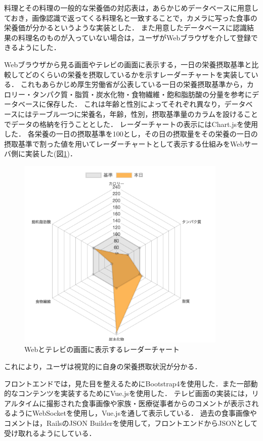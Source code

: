 \documentclass[../report]{subfiles}
\begin{document}
料理とその料理の一般的な栄養価の対応表は，あらかじめデータベースに用意しておき，画像認識で返ってくる料理名と一致することで，カメラに写った食事の栄養価が分かるというような実装とした．
また用意したデータベースに認識結果の料理名のものが入っていない場合は，ユーザがWebブラウザを介して登録できるようにした．

Webブラウザから見る画面やテレビの画面に表示する，一日の栄養摂取基準と比較してどのくらいの栄養を摂取しているかを示すレーダーチャートを実装している．
これもあらかじめ厚生労働省が公表している一日の栄養摂取基準から，カロリー・タンパク質・脂質・炭水化物・食物繊維・飽和脂肪酸の分量を参考にデータベースに保存した．
これは年齢と性別によってそれぞれ異なり，データベースにはテーブル一つに栄養名，年齢，性別，摂取基準量のカラムを設けることでデータの格納を行うこととした．
レーダーチャートの表示にはChart.jsを使用した．
各栄養の一日の摂取基準を100とし，その日の摂取量をその栄養の一日の摂取基準で割った値を用いてレーダーチャートとして表示する仕組みをWebサーバ側に実装した(図\ref{fig:6-radarchart})．

\begin{figure}[htbp]
    \begin{center}
        \includegraphics[width=10cm]{imgs/6_radar.png}
        \caption{Webとテレビの画面に表示するレーダーチャート}
        \label{fig:6-radarchart}
    \end{center}
\end{figure}

これにより，ユーザは視覚的に自身の栄養摂取状況が分かる．

フロントエンドでは，見た目を整えるためにBootstrap4を使用した．また一部動的なコンテンツを実装するためにVue.jsを使用した．
テレビ画面の実装には，リアルタイムに撮影された食事画像や家族・医療従事者からのコメントが表示されるようにWebSocketを使用し，Vue.jsを通して表示している．
過去の食事画像やコメントは，RailsのJSON Builderを使用して，フロントエンドからJSONとして受け取れるようにしている．
\end{document}
